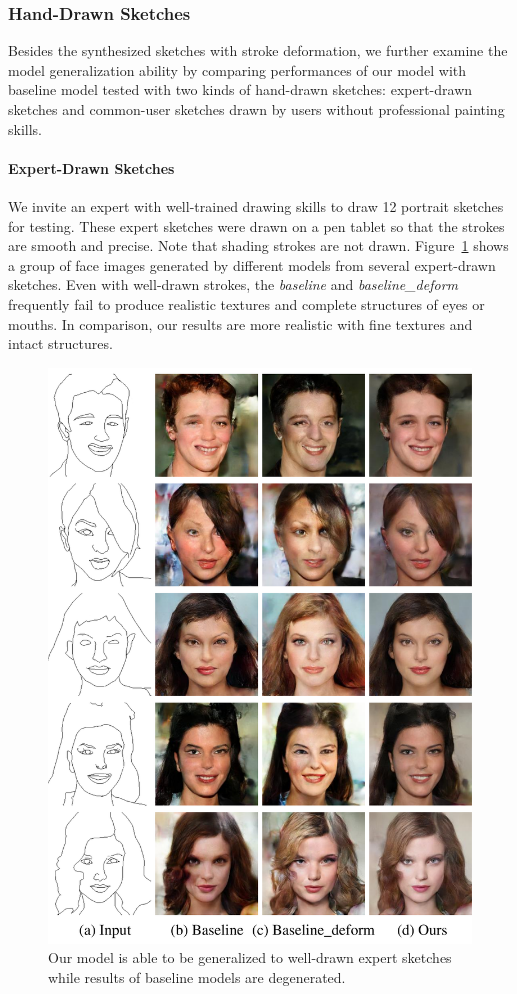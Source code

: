 \subsubsection{Hand-Drawn Sketches}
Besides the synthesized sketches with stroke deformation, we further examine the model generalization ability by comparing performances of our model with baseline model tested with two kinds of hand-drawn sketches: expert-drawn sketches and common-user sketches drawn by users without professional painting skills.

\paragraph{Expert-Drawn Sketches}
We invite an expert with well-trained drawing skills to draw 12 portrait sketches for testing. 
These expert sketches were drawn on a pen tablet so that the strokes are smooth and precise. 
Note that shading strokes are not drawn. 
%
Figure~\ref{fig:expert_sketches} shows a group of face images generated by different models from several expert-drawn sketches. 
%
Even with well-drawn strokes, the \textit{baseline} and \textit{baseline\_deform} frequently fail to produce realistic textures and complete structures of eyes or mouths. 
%
In comparison, our results are more realistic with fine textures and intact structures. 

\begin{figure}
	\includegraphics[width=0.9\linewidth]{figs/expertsketches}
	\caption{Our model is able to be generalized to well-drawn expert sketches while results of baseline models are degenerated.}
	\label{fig:expert_sketches}
\end{figure}



